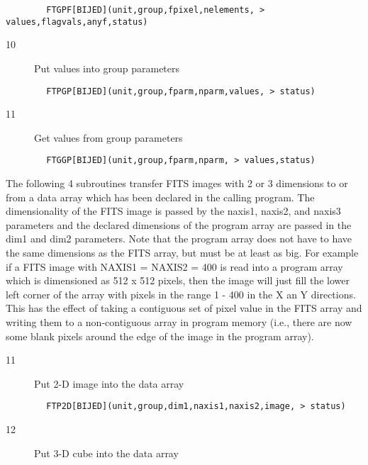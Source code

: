 \documentclass[11pt]{book}
\begin{document}
\begin{verbatim}
        FTGPF[BIJED](unit,group,fpixel,nelements, > values,flagvals,anyf,status)
\end{verbatim}

\begin{description}
\item[10]  Put values into group parameters
\end{description}

\begin{verbatim}
        FTPGP[BIJED](unit,group,fparm,nparm,values, > status)
\end{verbatim}

\begin{description}
\item[11]  Get values from group parameters
\end{description}

\begin{verbatim}
        FTGGP[BIJED](unit,group,fparm,nparm, > values,status)
\end{verbatim}
The following 4 subroutines transfer FITS images with 2 or 3 dimensions
to or from a data array which has been declared in the calling program.
The dimensionality of the FITS image is passed by the naxis1, naxis2,
and naxis3 parameters and the declared dimensions of the program array
are passed in the dim1 and dim2 parameters.  Note that the program array
does not have to have the same dimensions as the FITS array, but must
be at least as big.  For example if a FITS image with NAXIS1 = NAXIS2 = 400
is read into a program array which is dimensioned as 512 x 512 pixels,
then the image will just fill the lower left corner of the array
with pixels in the range 1 - 400 in the X an Y directions.  This has
the effect of taking a contiguous set of pixel value in the FITS array
and writing them to a non-contiguous array in program memory
(i.e., there are now some blank pixels around the edge of the image
in the program array).


\begin{description}
\item[11]  Put 2-D image into the data array
\end{description}

\begin{verbatim}
        FTP2D[BIJED](unit,group,dim1,naxis1,naxis2,image, > status)
\end{verbatim}

\begin{description}
\item[12]  Put 3-D cube into the data array
\end{description}
\end{document}

